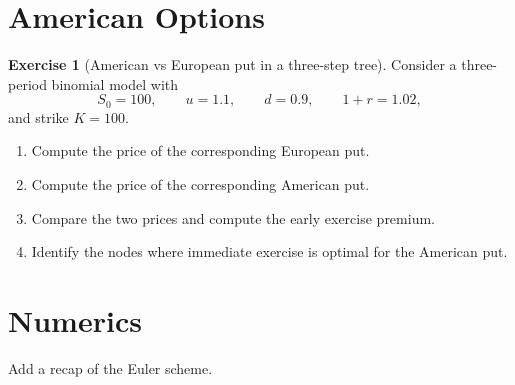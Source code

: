 \documentclass[11pt]{article}
\theoremstyle{plain}
\theoremstyle{definition}
\newtheorem{exercise}[theorem]{Exercise}
\theoremstyle{remark}
\begin{document}
\section{American Options}

\begin{exercise}[American vs European put in a three-step tree]
Consider a three-period binomial model with
\[
S_0=100,\qquad u=1.1,\qquad d=0.9,\qquad 1+r=1.02,
\]
and strike $K=100$.

\begin{enumerate}[leftmargin=1.6em]
\item Compute the price of the corresponding European put.

\item Compute the price of the corresponding American put.

\item Compare the two prices and compute the early exercise premium.

\item Identify the nodes where immediate exercise is optimal for the American put.
\end{enumerate}
\end{exercise}




\section{Numerics}

Add a recap of the Euler scheme.
\end{document}
